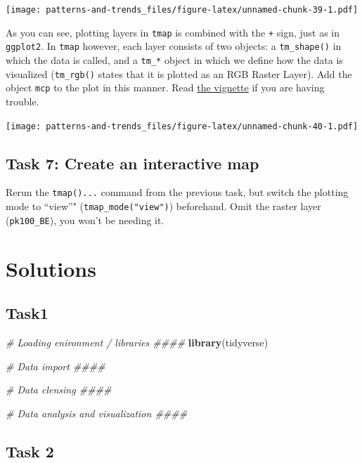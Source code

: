 \documentclass[]{book}
\newenvironment{Shaded}{\begin{snugshade}}{\end{snugshade}}
\newcommand{\KeywordTok}[1]{\textcolor[rgb]{0.13,0.29,0.53}{\textbf{#1}}}
\newcommand{\CommentTok}[1]{\textcolor[rgb]{0.56,0.35,0.01}{\textit{#1}}}
\newcommand{\NormalTok}[1]{#1}
\begin{document}
\texttt{[image: patterns-and-trends\_files/figure-latex/unnamed-chunk-39-1.pdf]}

As you can see, plotting layers in \texttt{tmap} is combined with the
\texttt{+} sign, just as in \texttt{ggplot2}. In \texttt{tmap} however,
each layer consists of two objects: a \texttt{tm\_shape()} in which the
data is called, and a \texttt{tm\_*} object in which we define how the
data is visualized (\texttt{tm\_rgb()} states that it is plotted as an
RGB Raster Layer). Add the object \texttt{mcp} to the plot in this
manner. Read
\href{https://cran.r-project.org/web/packages/tmap/vignettes/tmap-getstarted.html}{the
vignette} if you are having trouble.

\texttt{[image: patterns-and-trends\_files/figure-latex/unnamed-chunk-40-1.pdf]}

\subsection{Task 7: Create an interactive
map}\label{task-7-create-an-interactive-map}

Rerun the \texttt{tmap()...} command from the previous task, but switch
the plotting mode to ``view''" (\texttt{tmap\_mode("view")}) beforehand.
Omit the raster layer (\texttt{pk100\_BE}), you won't be needing it.

\section{Solutions}\label{solutions}

\subsection{Task1}\label{task1}

\begin{Shaded}
\begin{Highlighting}[]

\CommentTok{# Loading enironment / libraries ####}
\KeywordTok{library}\NormalTok{(tidyverse)}



\CommentTok{# Data import ####}

\CommentTok{# Data clensing ####}

\CommentTok{# Data analysis and visualization ####}
\end{Highlighting}
\end{Shaded}

\subsection{Task 2}\label{task-2}
\end{document}
